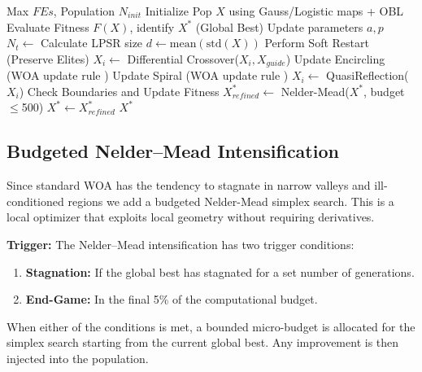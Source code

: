 \documentclass[conference]{IEEEtran}
\begin{document}
\begin{algorithm}[!t]
\caption{Hybrid IWOA with budgeted Nelder--Mead}
\label{alg:iwoa}
\begin{algorithmic}[1]
\REQUIRE Max $FEs$, Population $N_{init}$
\STATE Initialize Pop $X$ using Gauss/Logistic maps + OBL
\STATE Evaluate Fitness $F(X)$, identify $X^*$ (Global Best)
    \STATE Update parameters $a, p$
    \STATE $N_t \gets$ Calculate LPSR size
    \STATE $d \gets \mathrm{mean}(\mathrm{std}(X))$
        \STATE Perform Soft Restart (Preserve Elites)
    \ENDIF
            \STATE $X_i \gets$ Differential Crossover($X_i, X_{guide}$)
        \ELSE
                \STATE Update Encircling (WOA update rule \cite{mirjalili2016woa})
            \ELSE
                \STATE Update Spiral (WOA update rule \cite{mirjalili2016woa})
            \ENDIF
        \ENDIF
        \STATE $X_i \gets$ QuasiReflection($X_i$)
        \STATE Check Boundaries and Update Fitness
    \ENDFOR
        \STATE $X^*_{refined} \gets$ Nelder-Mead($X^*$, budget$\leq$500)
            \STATE $X^* \gets X^*_{refined}$
        \ENDIF
    \ENDIF
\ENDWHILE
\RETURN $X^*$
\end{algorithmic}
\end{algorithm}

\subsection{Budgeted Nelder--Mead Intensification}
Since standard WOA has the tendency to stagnate in narrow valleys and ill-conditioned regions we add a budgeted Nelder-Mead simplex search. This is a local optimizer that exploits local geometry without requiring derivatives.

\textbf{Trigger:} The Nelder--Mead intensification has two trigger conditions:
\begin{enumerate}
    \item \textbf{Stagnation:} If the global best has stagnated for a set number of generations.
    \item \textbf{End-Game:} In the final 5\% of the computational budget.
\end{enumerate}

When either of the conditions is met, a bounded micro-budget is allocated for the simplex search starting from the current global best. Any improvement is then injected into the population.
\end{document}
